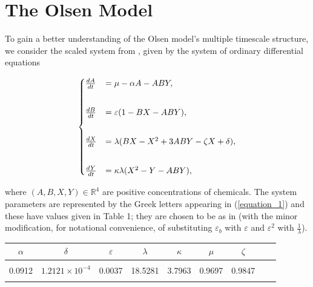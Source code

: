 \documentclass{ws-ijbc}
\begin{document}
\section{The Olsen Model}

To gain a better understanding of the Olsen model's multiple timescale structure, we consider the scaled system from \cite{Rescaling}, given by the system of ordinary differential equations
    
\begin{equation}
\begin{aligned}
\begin{cases}
\frac{dA}{dt} &= \mu - \alpha A - ABY, \\ \vspace{2mm}\\
\frac{dB}{dt} &= \varepsilon(1-BX - ABY), \\ \vspace{2mm}\\
\frac{dX}{dt} &= \lambda(BX - X^2 +3ABY - \zeta X + \delta), \\ \vspace{2mm}\\
\frac{dY}{dt} &= \kappa\lambda(X^2 - Y - ABY),
\end{cases}
\end{aligned}
\label{equation_1}
\end{equation}
    
\noindent
where $(A, B, X, Y)\in\mathbb{R}^{4}$ are positive concentrations of chemicals.  The system parameters are represented by the Greek letters appearing in (\ref{equation_1}) and these have values given in Table 1; they are chosen to be as in \cite{Rescaling} (with the minor modification, for notational convenience, of substituting  $\varepsilon_{b}$ with $\varepsilon$ and $\varepsilon^{2}$ with $\frac{1}{\lambda}$).

\begin{table}[h]
{\begin{tabular}{c  c  c  c  c  c  c  c  c} \\[-2pt]
\toprule
$\alpha$ & $\delta$ & $\varepsilon$ & $\lambda$ & $\kappa$ & $\mu$ & $\zeta$ \\[6pt]
\hline\\[-2pt]
0.0912 & $1.2121 \times 10^{-4}$ & 0.0037 & 18.5281 & 3.7963 & 0.9697 & 0.9847\\[1pt]
\botrule
\end{tabular}}
\end{table}
\end{document}
